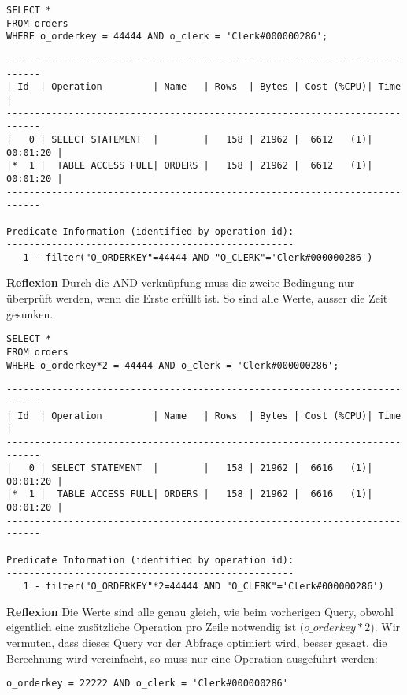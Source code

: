 \documentclass[10pt]{article}
\begin{document}
\begin{lstlisting}[style=sql]
SELECT *
FROM orders
WHERE o_orderkey = 44444 AND o_clerk = 'Clerk#000000286';
\end{lstlisting}
\begin{lstlisting}[style=queryexecutionplan]
----------------------------------------------------------------------------
| Id  | Operation         | Name   | Rows  | Bytes | Cost (%CPU)| Time     |
----------------------------------------------------------------------------
|   0 | SELECT STATEMENT  |        |   158 | 21962 |  6612   (1)| 00:01:20 |
|*  1 |  TABLE ACCESS FULL| ORDERS |   158 | 21962 |  6612   (1)| 00:01:20 |
----------------------------------------------------------------------------

Predicate Information (identified by operation id):
---------------------------------------------------
   1 - filter("O_ORDERKEY"=44444 AND "O_CLERK"='Clerk#000000286')
\end{lstlisting}
\textbf{Reflexion} \newline
Durch die AND-verknüpfung muss die zweite Bedingung nur überprüft werden, wenn 
die Erste erfüllt ist. So sind alle Werte, ausser die Zeit gesunken.

\begin{lstlisting}[style=sql]
SELECT *
FROM orders
WHERE o_orderkey*2 = 44444 AND o_clerk = 'Clerk#000000286';
\end{lstlisting}
\begin{lstlisting}[style=queryexecutionplan]
----------------------------------------------------------------------------
| Id  | Operation         | Name   | Rows  | Bytes | Cost (%CPU)| Time     |
----------------------------------------------------------------------------
|   0 | SELECT STATEMENT  |        |   158 | 21962 |  6616   (1)| 00:01:20 |
|*  1 |  TABLE ACCESS FULL| ORDERS |   158 | 21962 |  6616   (1)| 00:01:20 |
----------------------------------------------------------------------------

Predicate Information (identified by operation id):
---------------------------------------------------
   1 - filter("O_ORDERKEY"*2=44444 AND "O_CLERK"='Clerk#000000286')
\end{lstlisting}
\textbf{Reflexion} \newline
Die Werte sind alle genau gleich, wie beim vorherigen Query, obwohl eigentlich 
eine zusätzliche Operation pro Zeile notwendig ist ($o\_orderkey*2$). Wir 
vermuten, dass dieses Query vor der Abfrage optimiert wird, besser gesagt, die
Berechnung wird vereinfacht, so muss nur eine Operation ausgeführt werden:
\begin{lstlisting}[style=sqlNoTitle]
o_orderkey = 22222 AND o_clerk = 'Clerk#000000286'
\end{lstlisting}
\end{document}
